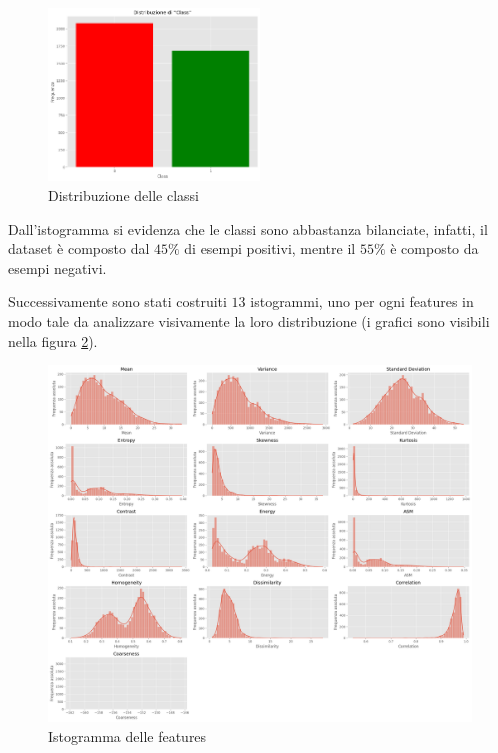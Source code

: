\begin{figure}[!ht]
      \centering
      \includegraphics[width=0.5\textwidth]{img/analisi/distribuzioneClassi.png}
      \caption{Distribuzione delle classi}
      \label{fig:dist-classi}
\end{figure}

Dall'istogramma si evidenza che le classi sono abbastanza bilanciate, infatti,
il dataset è composto dal $45\%$ di esempi positivi, mentre il $55\%$ è composto
da esempi negativi.

Successivamente sono stati costruiti $13$ istogrammi, uno per ogni features
in modo tale da analizzare visivamente la loro distribuzione (i grafici sono visibili
nella figura \ref{fig:barplot_features}).

\begin{figure}[!ht]
      \centering
      \includegraphics[width=\textwidth]{img/analisi/barplot.png}
      \caption{Istogramma delle features}
      \label{fig:barplot_features}
\end{figure}

